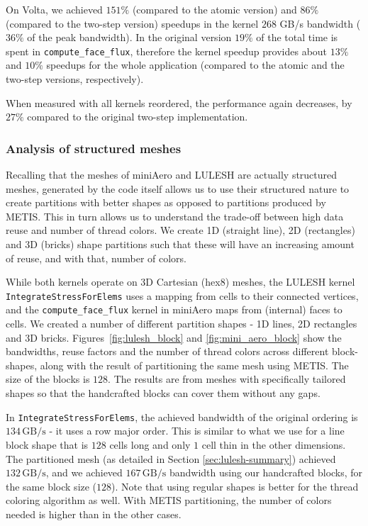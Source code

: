 On Volta, we achieved $151\%$ (compared to the atomic version) and $86\%$
(compared to the two-step version) speedups in the kernel $268$ GB/s bandwidth
($36\%$ of the peak bandwidth). In the original version $19\%$ of the total time
is spent in \texttt{compute\_face\_flux}, therefore the kernel speedup
provides about $13\%$ and $10\%$ speedups for the whole application (compared
to the atomic and the two-step versions, respectively).

When measured with all kernels reordered, the performance again decreases, by
$27\%$ compared to the original two-step implementation.


\subsubsection{Analysis of structured meshes}
\label{analysis-of-structured-meshes}

\noindent Recalling that the meshes of miniAero and LULESH are actually 
structured meshes, generated by the code itself allows us to use their 
structured nature to create partitions with better shapes as opposed to 
partitions produced by METIS. This in turn allows us to understand the trade-off 
between high data reuse and number of thread colors.  We create 1D (straight 
line), 2D (rectangles) and 3D (bricks) shape partitions such that these will 
have an increasing amount of reuse, and with that, number  of colors. 

While both kernels operate on 3D Cartesian (hex8) meshes, the LULESH kernel 
\texttt{IntegrateStressForElems} uses a mapping from cells to their connected 
vertices, and the \texttt{compute\_face\_flux} kernel in miniAero maps from 
(internal) faces to cells. We created a number of different partition shapes - 
1D lines, 2D rectangles and 3D bricks. Figures~\ref{fig:lulesh_block} and 
\ref{fig:mini_aero_block} show the bandwidths, reuse factors and the number of 
thread colors across different block-shapes, along with the result of 
partitioning the same mesh using METIS. The size of the blocks is $128$. The 
results are from meshes with specifically tailored shapes so that the 
handcrafted blocks can cover them without any gaps. 

In \texttt{IntegrateStressForElems}, the achieved bandwidth of the 
original ordering is $134\,\text{GB/s}$ - it uses a row major order. This is 
similar to what we use for a line block shape that is $128$ cells long and only $1$ 
cell thin in the other dimensions. The partitioned mesh (as detailed in Section 
\ref{sec:lulesh-summary}) achieved $132\,\text{GB/s}$, and we achieved 
$167\,\text{GB/s}$ bandwidth using our handcrafted blocks, for the same block 
size ($128$). Note that using regular shapes is better for the thread coloring 
algorithm as well. With METIS partitioning, the number of colors needed 
is higher than in the other cases.

